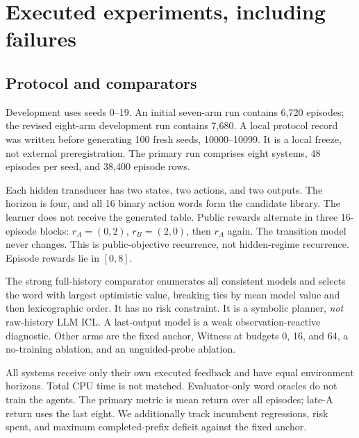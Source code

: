 \documentclass[10pt,twocolumn]{article}
\begin{document}
\section{Executed experiments, including failures}
\subsection{Protocol and comparators}
Development uses seeds 0--19. An initial seven-arm run contains 6,720 episodes;
the revised eight-arm development run contains 7,680. A local protocol record
was written before generating 100 fresh seeds, 10000--10099. It is a local
freeze, not external preregistration. The primary run comprises eight systems,
48 episodes per seed, and 38,400 episode rows.

Each hidden transducer has two states, two actions, and two outputs. The horizon
is four, and all 16 binary action words form the candidate library. The learner
does not receive the generated table. Public rewards alternate in three
16-episode blocks: $r_A=(0,2)$, $r_B=(2,0)$, then $r_A$ again. The transition
model never changes. This is public-objective recurrence, not hidden-regime
recurrence. Episode rewards lie in $[0,8]$.

The strong full-history comparator enumerates all consistent models and selects
the word with largest optimistic value, breaking ties by mean model value and
then lexicographic order. It has no risk constraint. It is a symbolic planner,
\emph{not} raw-history LLM ICL. A last-output model is a weak observation-reactive
diagnostic. Other arms are the fixed anchor, Witness at budgets 0, 16, and 64,
a no-training ablation, and an unguided-probe ablation.

All systems receive only their own executed feedback and have equal environment
horizons. Total CPU time is not matched. Evaluator-only word oracles do not train
the agents. The primary metric is mean return over all episodes; late-A return
uses the last eight. We additionally track incumbent regressions, risk spent,
and maximum completed-prefix deficit against the fixed anchor.

\begin{table}[t]
\centering

\caption{Executed primary study: 100 fresh seeds, eight systems, 48 episodes,
38,400 rows. Mean and late-A values are rewards, not percentages. Maximum deficit
is the worst completed-prefix anchor deficit across all seeds. The strong
full-history planner is symbolic, not an LLM ICL baseline.}
\label{tab:main}
\end{table}
\end{document}
